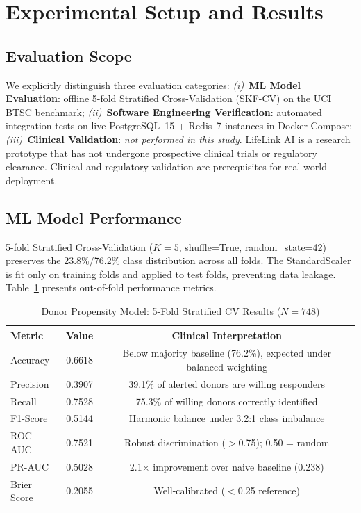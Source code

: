 \documentclass[conference]{IEEEtran}
\begin{document}
\section{Experimental Setup and Results}

\subsection{Evaluation Scope}
We explicitly distinguish three evaluation categories:
\emph{(i)}~\textbf{ML Model Evaluation}: offline 5-fold Stratified
Cross-Validation (SKF-CV) on the UCI BTSC benchmark;
\emph{(ii)}~\textbf{Software Engineering Verification}: automated
integration tests on live PostgreSQL~15 + Redis~7 instances in
Docker Compose;
\emph{(iii)}~\textbf{Clinical Validation}: \emph{not performed in this
study}. LifeLink AI is a research prototype that has not undergone
prospective clinical trials or regulatory clearance. Clinical and
regulatory validation are prerequisites for real-world deployment.

\subsection{ML Model Performance}
5-fold Stratified Cross-Validation ($K{=}5$, shuffle=True,
random\_state=42) preserves the 23.8\%/76.2\% class distribution
across all folds. The StandardScaler is fit only on training folds and
applied to test folds, preventing data leakage. Table~\ref{tab:ml}
presents out-of-fold performance metrics.

\begin{table}[t]
  \centering
  \caption{Donor Propensity Model: 5-Fold Stratified CV Results
           ($N{=}748$)}
  \label{tab:ml}
  \setlength{\tabcolsep}{3pt}
  \renewcommand{\arraystretch}{1.1}
  \begin{tabular}{@{}lcc@{}}
    \toprule
    \textbf{Metric} & \textbf{Value} & \textbf{Clinical Interpretation} \\
    \midrule
    Accuracy     & 0.6618 & Below majority baseline (76.2\%), expected under balanced weighting \\
    Precision    & 0.3907 & 39.1\% of alerted donors are willing responders \\
    Recall       & 0.7528 & 75.3\% of willing donors correctly identified \\
    F1-Score     & 0.5144 & Harmonic balance under 3.2:1 class imbalance \\
    ROC-AUC      & 0.7521 & Robust discrimination ($>$0.75); 0.50 = random \\
    PR-AUC       & 0.5028 & 2.1$\times$ improvement over naive baseline (0.238) \\
    Brier Score  & 0.2055 & Well-calibrated ($<$0.25 reference) \\
    \bottomrule
  \end{tabular}
\end{table}
\end{document}
